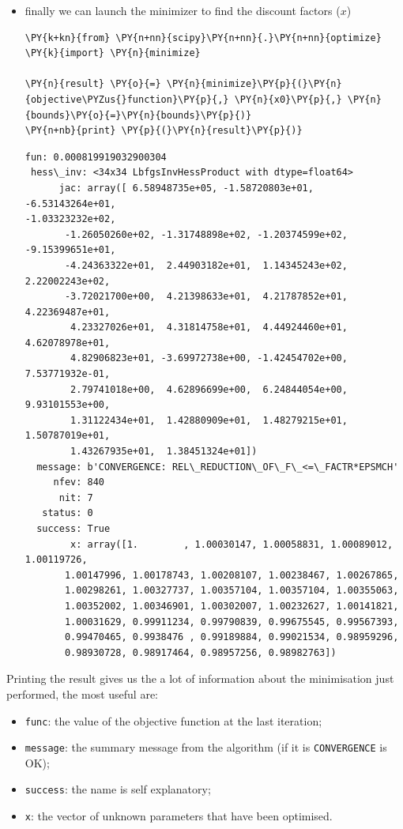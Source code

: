 \begin{itemize}
\item
  finally we can launch the minimizer to find the discount factors
  (\(x\))

    \begin{tcolorbox}[breakable, size=fbox, boxrule=1pt, pad at break*=1mm,colback=cellbackground, colframe=cellborder]
\begin{Verbatim}[commandchars=\\\{\}]
\PY{k+kn}{from} \PY{n+nn}{scipy}\PY{n+nn}{.}\PY{n+nn}{optimize} \PY{k}{import} \PY{n}{minimize}

\PY{n}{result} \PY{o}{=} \PY{n}{minimize}\PY{p}{(}\PY{n}{objective\PYZus{}function}\PY{p}{,} \PY{n}{x0}\PY{p}{,} \PY{n}{bounds}\PY{o}{=}\PY{n}{bounds}\PY{p}{)}
\PY{n+nb}{print} \PY{p}{(}\PY{n}{result}\PY{p}{)}
\end{Verbatim}
\end{tcolorbox}

    \begin{Verbatim}[commandchars=\\\{\}]
      fun: 0.000819919032900304
 hess\_inv: <34x34 LbfgsInvHessProduct with dtype=float64>
      jac: array([ 6.58948735e+05, -1.58720803e+01, -6.53143264e+01,
-1.03323232e+02,
       -1.26050260e+02, -1.31748898e+02, -1.20374599e+02, -9.15399651e+01,
       -4.24363322e+01,  2.44903182e+01,  1.14345243e+02,  2.22002243e+02,
       -3.72021700e+00,  4.21398633e+01,  4.21787852e+01,  4.22369487e+01,
        4.23327026e+01,  4.31814758e+01,  4.44924460e+01,  4.62078978e+01,
        4.82906823e+01, -3.69972738e+00, -1.42454702e+00,  7.53771932e-01,
        2.79741018e+00,  4.62896699e+00,  6.24844054e+00,  9.93101553e+00,
        1.31122434e+01,  1.42880909e+01,  1.48279215e+01,  1.50787019e+01,
        1.43267935e+01,  1.38451324e+01])
  message: b'CONVERGENCE: REL\_REDUCTION\_OF\_F\_<=\_FACTR*EPSMCH'
     nfev: 840
      nit: 7
   status: 0
  success: True
        x: array([1.        , 1.00030147, 1.00058831, 1.00089012, 1.00119726,
       1.00147996, 1.00178743, 1.00208107, 1.00238467, 1.00267865,
       1.00298261, 1.00327737, 1.00357104, 1.00357104, 1.00355063,
       1.00352002, 1.00346901, 1.00302007, 1.00232627, 1.00141821,
       1.00031629, 0.99911234, 0.99790839, 0.99675545, 0.99567393,
       0.99470465, 0.9938476 , 0.99189884, 0.99021534, 0.98959296,
       0.98930728, 0.98917464, 0.98957256, 0.98982763])
    \end{Verbatim}
\end{itemize}

Printing the result gives us the a lot of information about the minimisation just performed, the most useful are:
\begin{itemize}
\item \texttt{func}: the value of the objective function at the last iteration;
\item \texttt{message}: the summary message from the algorithm (if it is \texttt{CONVERGENCE} is OK);
\item \texttt{success}: the name is self explanatory;
\item \texttt{x}: the vector of unknown parameters that have been optimised.
\end{itemize}

